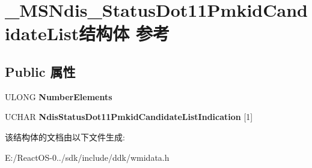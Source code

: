 \hypertarget{struct___m_s_ndis___status_dot11_pmkid_candidate_list}{}\section{\+\_\+\+M\+S\+Ndis\+\_\+\+Status\+Dot11\+Pmkid\+Candidate\+List结构体 参考}
\label{struct___m_s_ndis___status_dot11_pmkid_candidate_list}
\subsection*{Public 属性}
\begin{DoxyCompactItemize}
\item 
\mbox{\label{struct___m_s_ndis___status_dot11_pmkid_candidate_list_aee8fb597ae630a03db38b953343d7251}} 
U\+L\+O\+NG {\bfseries Number\+Elements}
\item 
\mbox{\label{struct___m_s_ndis___status_dot11_pmkid_candidate_list_adc038594e7be068a034932e93d1d9885}} 
U\+C\+H\+AR {\bfseries Ndis\+Status\+Dot11\+Pmkid\+Candidate\+List\+Indication} \mbox{[}1\mbox{]}
\end{DoxyCompactItemize}


该结构体的文档由以下文件生成\+:\begin{DoxyCompactItemize}
\item 
E\+:/\+React\+O\+S-\/0../sdk/include/ddk/wmidata.\+h\end{DoxyCompactItemize}
